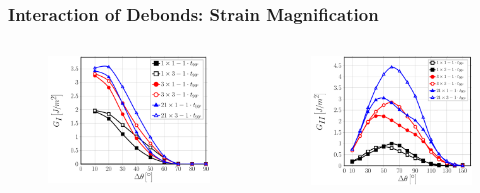 \documentclass[first,firstsupp,lastsupp,last,hyperref,table]{ETHclass}
\begin{document}
\begin{frame}
\frametitle{\vspace{0.2cm}\small Interaction of Debonds: Strain Magnification}
\vspace{-.75cm}
\centering
\begin{columns}[c]
\centering
\begin{column}{0.5\textwidth}
\centering
\begin{figure}
\centering
\includegraphics[width=\columnwidth]{nxk-1-vf60-GI-strainmagni21.pdf}
\end{figure}
\end{column}
\begin{column}{0.5\textwidth}
\centering
\begin{figure}
\centering
\includegraphics[width=\columnwidth]{nxk-1-vf60-GII-strainmagni21.pdf}

\end{figure}
\end{column}
\end{columns}
\end{frame}
\end{document}
